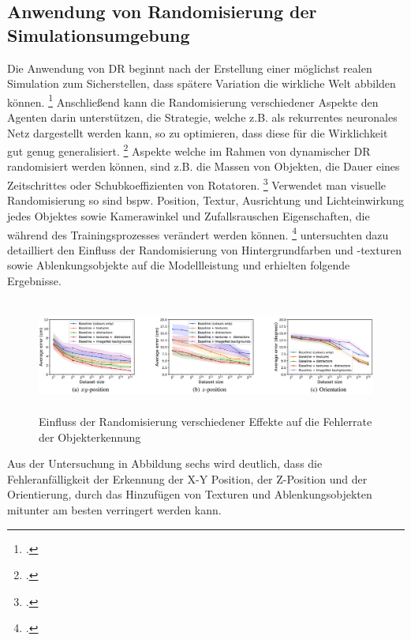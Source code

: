 \subsection{Anwendung von Randomisierung der Simulationsumgebung}

Die Anwendung von DR beginnt nach der Erstellung einer möglichst realen Simulation zum Sicherstellen, dass spätere Variation die wirkliche Welt abbilden können. \footcite[Vgl.][S. 4]{Chen.2021}
Anschließend kann die Randomisierung verschiedener Aspekte den Agenten darin unterstützen, die Strategie, welche z.B. als rekurrentes neuronales Netz dargestellt werden kann, so zu optimieren, dass diese für die Wirklichkeit gut genug generalisiert. \footcite[Vgl.][S. 4]{Chen.2021}
Aspekte welche im Rahmen von dynamischer DR randomisiert werden können, sind z.B. die Massen von Objekten, die Dauer eines Zeitschrittes oder Schubkoeffizienten von Rotatoren. \footcite[Vgl.][S. 4]{Molchanov.2019}
Verwendet man visuelle Randomisierung so sind bspw. Position, Textur, Ausrichtung und Lichteinwirkung jedes Objektes sowie Kamerawinkel und Zufallsrauschen Eigenschaften, die während des Trainingsprozesses verändert werden können. \footcite[Vgl.][S. 3]{Tobin.2017}
\cite[]{Alghonaim.5302021652021} untersuchten dazu detailliert den Einfluss der Randomisierung von Hintergrundfarben und -texturen sowie Ablenkungsobjekte auf die Modellleistung und erhielten folgende Ergebnisse.

\begin{figure}[htb]
    \centering
    \includegraphics[height=3.7cm]{lib/graphics/influence_visual_randomness.png}
    \caption[Einfluss der Randomisierung verschiedener Effekte auf die Fehlerrate der Objekterkennung]{Einfluss der Randomisierung verschiedener Effekte auf die Fehlerrate der Objekterkennung\footnotemark}
    \label{abb:visual_randomization}
\end{figure}

Aus der Untersuchung in Abbildung sechs wird deutlich, dass die Fehleranfälligkeit der Erkennung der X-Y Position, der Z-Position und der Orientierung, durch das Hinzufügen von Texturen und Ablenkungsobjekten mitunter am besten verringert werden kann. 


